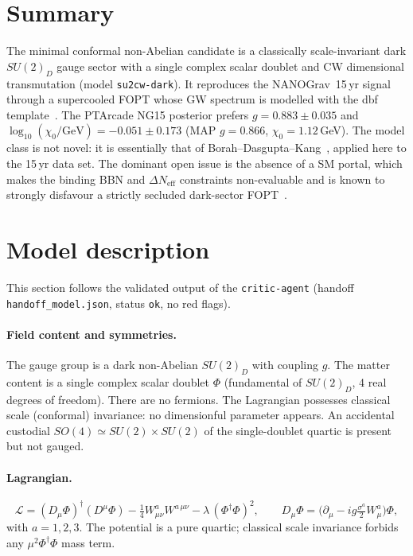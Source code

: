 \documentclass[11pt]{article}
\newcommand{\Neff}{N_{\mathrm{eff}}}
\newcommand{\chizero}{\chi_0}
\begin{document}
\section{Summary}
The minimal conformal non-Abelian candidate is a classically scale-invariant dark $SU(2)_D$ gauge
sector with a single complex scalar doublet and CW dimensional transmutation (model
\texttt{su2cw-dark}). It reproduces the NANOGrav~15\,yr signal through a supercooled FOPT whose GW
spectrum is modelled with the dbf template~\cite{LewickiVaskonen2025}. The PTArcade NG15 posterior
prefers $g=0.883\pm0.035$ and $\log_{10}(\chizero/\mathrm{GeV})=-0.051\pm0.173$ (MAP
$g=0.866$, $\chizero=1.12\,$GeV). The model class is not novel: it is essentially that of
Borah--Dasgupta--Kang~\cite{Borah2021}, applied here to the 15\,yr data set. The dominant open issue
is the absence of a SM portal, which makes the binding BBN and $\Delta\Neff$ constraints
non-evaluable and is known to strongly disfavour a strictly secluded dark-sector FOPT~\cite{Bringmann2023}.

\section{Model description}
\label{sec:model}
This section follows the validated output of the \texttt{critic-agent} (handoff
\texttt{handoff\_model.json}, status \texttt{ok}, no red flags).

\paragraph{Field content and symmetries.}
The gauge group is a dark non-Abelian $SU(2)_D$ with coupling $g$. The matter content is a single
complex scalar doublet $\Phi$ (fundamental of $SU(2)_D$, 4 real degrees of freedom). There are no
fermions. The Lagrangian possesses classical scale (conformal) invariance: no dimensionful parameter
appears. An accidental custodial $SO(4)\simeq SU(2)\times SU(2)$ of the single-doublet quartic is
present but not gauged.

\paragraph{Lagrangian.}
\begin{equation}
\mathcal{L} = (D_\mu\Phi)^\dagger (D^\mu\Phi) - \tfrac14 W^a_{\mu\nu}W^{a\,\mu\nu}
- \lambda\,(\Phi^\dagger\Phi)^2 ,
\qquad
D_\mu\Phi = \big(\partial_\mu - i g \tfrac{\sigma^a}{2} W^a_\mu\big)\Phi ,
\end{equation}
with $a=1,2,3$. The potential is a pure quartic; classical scale invariance forbids any $\mu^2
\Phi^\dagger\Phi$ mass term.
\end{document}

